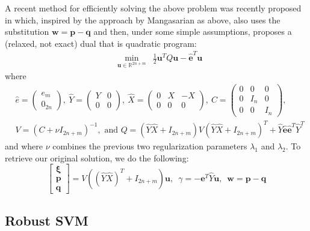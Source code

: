 \documentclass[11pt]{article}
\newcommand{\ds}{\displaystyle}
\begin{document}
A recent method for efficiently solving the above problem was recently proposed in \cite{pqsvm} which, inspired by the approach by Mangasarian as above, also uses the substitution $\bm{w} = \bm{p} - \bm{q}$ and then, under some simple assumptions, proposes a (relaxed, not exact) dual that is quadratic program:
\begin{eqnarray*}
& \ds\min_{\bm{u}\in\mathbb{R}^{2n+m}} & \frac{1}{2}\bm{u}^T Q \bm{u} - \hat{\bm{e}}^T\bm{u}
\end{eqnarray*}
where
{\allowdisplaybreaks
\begin{align*}
& \hat{e} = \begin{pmatrix} e_m \\ 0_{2n} \end{pmatrix}, \ \hat{Y} = \begin{pmatrix} Y & 0 \\ 0 & 0 \end{pmatrix}, \ \hat{X} = \begin{pmatrix} 0 & X & -X \\ 0 & 0 & 0 \end{pmatrix}, \ C = \begin{pmatrix} 0 & 0 & 0 \\ 0 & I_n & 0 \\ 0 & 0 & I_n \end{pmatrix}, 
\\
& V = \left(C + \nu I_{2n+m}\right)^{-1}, \mbox{  and  } Q = \left(\hat{Y}\hat{X} + I_{2n+m}\right)V\left(\hat{Y}\hat{X}+I_{2n+m}\right)^T + \hat{Y}\hat{\bm{e}}\hat{\bm{e}}^T\hat{Y}^T
\end{align*}}
and where $\nu$ combines the previous two regularization parameters $\lambda_1$ and $\lambda_2$. To retrieve our original solution, we do the following:
\[
\begin{bmatrix} \bm{\xi} \\ \bm{p} \\ \bm{q} \end{bmatrix} = V\left(\left(\hat{Y}\hat{X}\right)^T + I_{2n+m}\right)\bm{u}, \enspace \gamma = -\bm{e}^T\hat{Y}\bm{u}, \enspace \bm{w} = \bm{p} - \bm{q}
\]

\subsection{Robust SVM \cite{rsvm}}
\end{document}

